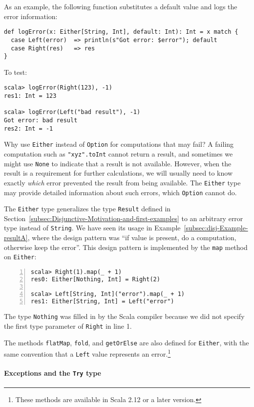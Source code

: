 As an example, the following function substitutes a default value
and logs the error information:
\begin{lstlisting}
def logError(x: Either[String, Int], default: Int): Int = x match {
  case Left(error)  => println(s"Got error: $error"); default
  case Right(res)   => res
}
\end{lstlisting}
To test:
\begin{lstlisting}
scala> logError(Right(123), -1)
res1: Int = 123

scala> logError(Left("bad result"), -1)
Got error: bad result
res2: Int = -1
\end{lstlisting}

Why use \lstinline!Either! instead of \lstinline!Option! for computations
that may fail? A failing computation such as \lstinline!"xyz".toInt!
cannot return a result, and sometimes we might use \lstinline!None!
to indicate that a result is not available. However, when the result
is a requirement for further calculations, we will usually need to
know exactly \emph{which} error prevented the result from being available.
The \lstinline!Either! type may provide detailed information about
such errors, which \lstinline!Option! cannot do. 

The \lstinline!Either! type generalizes the type \lstinline!Result!
defined in Section~\ref{subsec:Disjunctive-Motivation-and-first-examples}
to an arbitrary error type instead of \lstinline!String!. We have
seen its usage in Example~\ref{subsec:disj-Example-resultA}, where
the design pattern was \textsf{``}if value is present, do a computation, otherwise
keep the error\textsf{''}. This design pattern is implemented by the \lstinline!map!
method on \lstinline!Either!:
\begin{lstlisting}[numbers=left]
scala> Right(1).map(_ + 1)
res0: Either[Nothing, Int] = Right(2)

scala> Left[String, Int]("error").map(_ + 1)
res1: Either[String, Int] = Left("error")
\end{lstlisting}
The type \lstinline!Nothing! was filled in by the Scala compiler
because we did not specify the first type parameter of \lstinline!Right!
in line 1.

The methods \lstinline!flatMap!, \lstinline!fold!, and \lstinline!getOrElse!
are also defined for \lstinline!Either!, with the same convention
that a \lstinline!Left! value represents an error.\footnote{These methods are available in Scala 2.12 or a later version.}

\paragraph{Exceptions and the \texttt{Try} type}

